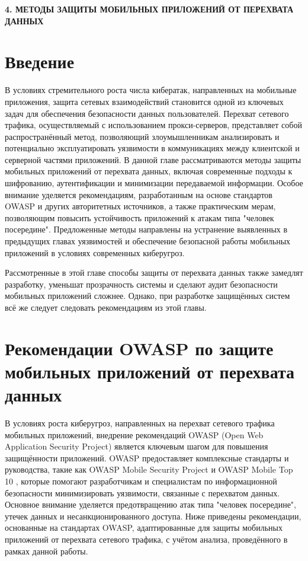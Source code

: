 \newpage
\begin{center}
  \textbf{\large 4. МЕТОДЫ ЗАЩИТЫ МОБИЛЬНЫХ ПРИЛОЖЕНИЙ ОТ ПЕРЕХВАТА ДАННЫХ}
\end{center}

\section{Введение}

В условиях стремительного роста числа кибератак, направленных на мобильные приложения, защита сетевых взаимодействий становится одной из ключевых задач для обеспечения безопасности данных пользователей. Перехват сетевого трафика, осуществляемый с использованием прокси-серверов, представляет собой распространённый метод, позволяющий злоумышленникам анализировать и потенциально эксплуатировать уязвимости в коммуникациях между клиентской и серверной частями приложений. В данной главе рассматриваются методы защиты мобильных приложений от перехвата данных, включая современные подходы к шифрованию, аутентификации и минимизации передаваемой информации. Особое внимание уделяется рекомендациям, разработанным на основе стандартов OWASP и других авторитетных источников, а также практическим мерам, позволяющим повысить устойчивость приложений к атакам типа "человек посередине". Предложенные методы направлены на устранение выявленных в предыдущих главах уязвимостей и обеспечение безопасной работы мобильных приложений в условиях современных киберугроз.

Рассмотренные в этой главе способы защиты от перехвата данных также замедлят разработку, уменьшат прозрачность системы и сделают аудит безопасности мобильных приложений сложнее. Однако, при разработке защищённых систем всё же следует следовать рекомендациям из этой главы.

\section{Рекомендации OWASP по защите мобильных приложений от перехвата данных}

В условиях роста киберугроз, направленных на перехват сетевого трафика мобильных приложений, внедрение рекомендаций OWASP (Open Web Application Security Project) является ключевым шагом для повышения защищённости приложений. OWASP предоставляет комплексные стандарты и руководства, такие как OWASP Mobile Security Project и OWASP Mobile Top 10 \cite{owasp_mobile_security_project, owasp_mobile_top_10_2016}, которые помогают разработчикам и специалистам по информационной безопасности минимизировать уязвимости, связанные с перехватом данных. Основное внимание уделяется предотвращению атак типа "человек посередине", утечек данных и несанкционированного доступа. Ниже приведены рекомендации, основанные на стандартах OWASP, адаптированные для защиты мобильных приложений от перехвата сетевого трафика, с учётом анализа, проведённого в рамках данной работы.

